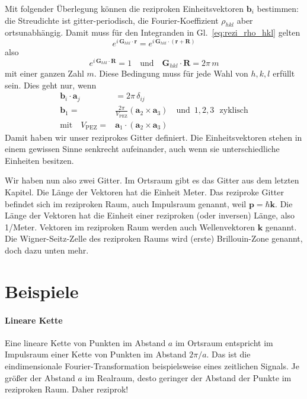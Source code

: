 Mit folgender Überlegung können die reziproken Einheitsvektoren $\mathbf{b}_i$ bestimmen: die Streudichte ist gitter-periodisch, die Fourier-Koeffizient $\rho_{hkl}$ aber ortsunabhängig. Damit muss für den Integranden in Gl.~\ref{eq:rezi_rho_hkl} gelten
\begin{equation}
 e^{i \, \mathbf{G}_{hkl} \cdot \mathbf{r}}  =  e^{i \, \mathbf{G}_{hkl} \cdot (\mathbf{r} + \mathbf{R})}
\end{equation}
also 
\begin{equation}
 e^{i \, \mathbf{G}_{hkl} \cdot  \mathbf{R}} = 1 \quad \text{und} \quad \mathbf{G}_{hkl} \cdot  \mathbf{R} = 2 \pi \, m
\end{equation}
mit einer ganzen Zahl $m$. Diese Bedingung muss für jede Wahl von $h,k,l$ erfüllt sein. Dies geht nur, wenn
\begin{align}
 \mathbf{b}_i \cdot \mathbf{a}_j & = 2 \pi \, \delta_{ij}  \\
  \mathbf{b}_1 = &\frac{2 \pi}{V_\text{PEZ}} \left(  \mathbf{a}_2 \times \mathbf{a}_3 \right)  \quad \text{und } \, 1,2,3 \, \,\text{ zyklisch} \\
  \text{mit} \quad  V_\text{PEZ} = &  \mathbf{a}_1 \cdot \left(  \mathbf{a}_2   \times \mathbf{a}_3 \right)
\end{align}
Damit haben wir unser reziprokes Gitter definiert. Die Einheitsvektoren stehen in einem gewissen Sinne senkrecht aufeinander, auch wenn  sie unterschiedliche Einheiten besitzen.


Wir haben nun also zwei Gitter. Im Ortsraum gibt es das Gitter aus dem letzten Kapitel. Die Länge der Vektoren hat die Einheit Meter. Das reziproke Gitter befindet sich im reziproken Raum, auch Impulsraum genannt, weil $\mathbf{p} = \hbar \mathbf{k}$. Die Länge der Vektoren hat die Einheit einer reziproken (oder inversen) Länge, also 1/Meter. Vektoren im reziproken Raum werden auch Wellenvektoren $\mathbf{k}$ genannt. Die Wigner-Seitz-Zelle des reziproken Raums wird (erste) Brillouin-Zone genannt, doch dazu unten mehr.


\section{Beispiele}

\paragraph{Lineare Kette} Eine lineare Kette von Punkten im Abstand $a$ im Ortsraum entspricht im Impulsraum einer Kette von Punkten im Abstand $2 \pi/a$. Das ist die eindimensionale Fourier-Transformation beispielsweise eines zeitlichen Signals. Je größer der Abstand $a$ im Realraum, desto geringer der Abstand der Punkte im reziproken Raum. Daher reziprok!

